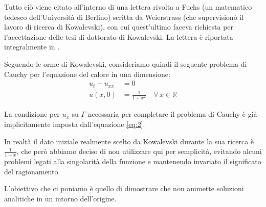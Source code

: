 Tutto ciò viene citato all'interno di una lettera rivolta a Fuchs (un matematico tedesco dell'Università di Berlino) scritta da Weierstrass (che supervisionò il lavoro di ricerca di  Kowalevski), con cui quest'ultimo faceva richiesta per l'accettazione delle tesi di dottorato di Kowalevski. La lettera è riportata integralmente in \cite[app.C]{Bio}.
 
Seguendo le orme di Kowalevski, consideriamo quindi il seguente problema di Cauchy per l'equazione del calore in una dimensione:
\begin{align}
\label{eq:1}
u_t-u_{xx}&=0\\ 
\label{eq:2}
u(x,0)&=\frac{1}{1+x^2} \quad \forall \, x \in \mathbb{R}
\end{align}
\begin{remark}
La condizione per $u_x$ su $\Gamma$ necessaria per completare il problema di Cauchy è già implicitamente imposta dall'equazione
\eqref{eq:2}.
\end{remark}
\begin{remark}
In realtà il dato iniziale realmente scelto da Kowalevski durante la sua ricerca è $\frac{1}{1-x}$, che però abbiamo deciso di non utilizzare qui per semplicità, evitando alcuni problemi legati alla singolarità della funzione e mantenendo invariato il significato del ragionamento.
\end{remark}
L'obiettivo che ci poniamo è quello di dimostrare che non ammette soluzioni analitiche in un intorno dell'origine.

